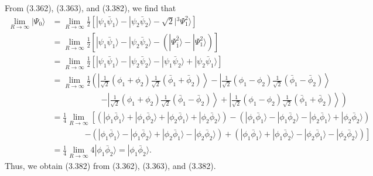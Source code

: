 \documentclass[a4paper]{book}
\newcounter{solution}[chapter]
\begin{document}
	\begin{solution}
	
	From (3.362), (3.363), and (3.382), we find that
	\begin{align*}
		\lim_{ R \rightarrow \infty } | \Psi_0 \rangle &= \lim_{ R \rightarrow \infty } \frac{1}{2} \left[ | \psi_1 \bar{\psi}_1 \rangle - | \psi_2 \bar{\psi}_2 \rangle - \sqrt{2} | {}^3 \Psi^2_1 \rangle \right] \\
		&= \lim_{ R \rightarrow \infty } \frac{1}{2} \left[ | \psi_1 \bar{\psi}_1 \rangle - | \psi_2 \bar{\psi}_2 \rangle - \left( | \Psi^{\bar{2}}_{\bar{1}} \rangle - | \Psi^2_1 \rangle  \right) \right] \\
		&= \lim_{ R \rightarrow \infty } \frac{1}{2} \left[ | \psi_1 \bar{\psi}_1 \rangle - | \psi_2 \bar{\psi}_2 \rangle - | \psi_1 \bar{\psi}_2 \rangle + | \psi_2 \bar{\psi}_1 \rangle \right] \\
		&= \lim_{ R \rightarrow \infty } \frac{1}{2} \left( \left| \frac{1}{ \sqrt{2} }( \phi_1 + \phi_2 ) \frac{1}{ \sqrt{2} }( \bar{\phi}_1 + \bar{\phi}_2 ) \right\rangle - \left|  \frac{1}{ \sqrt{2} }( \phi_1 - \phi_2 ) \frac{1}{ \sqrt{2} }( \bar{\phi}_1 - \bar{\phi}_2 ) \right\rangle \right. \\
		&\hspace{6em} \left. - \left| \frac{1}{ \sqrt{2} }( \phi_1 + \phi_2 ) \frac{1}{ \sqrt{2} }( \bar{\phi}_1 - \bar{\phi}_2 ) \right\rangle + \left|  \frac{1}{ \sqrt{2} }( \phi_1 - \phi_2 ) \frac{1}{ \sqrt{2} }( \bar{\phi}_1 + \bar{\phi}_2 ) \right\rangle \right) \\
		&= \frac{1}{4} \lim_{ R \rightarrow \infty } \left[ \left( | \phi_1 \bar{\phi}_1 \rangle + | \phi_1 \bar{\phi}_2 \rangle + | \phi_2 \bar{\phi}_1 \rangle + | \phi_2 \bar{\phi}_2 \rangle \right) - \left( | \phi_1 \bar{\phi}_1 \rangle - | \phi_1 \bar{\phi}_2 \rangle - | \phi_2 \bar{\phi}_1 \rangle + | \phi_2 \bar{\phi}_2 \rangle \right) \right. \\
		&\hspace{4em} \left. - \left( | \phi_1 \bar{\phi}_1 \rangle - | \phi_1 \bar{\phi}_2 \rangle + | \phi_2 \bar{\phi}_1 \rangle - | \phi_2 \bar{\phi}_2 \rangle \right) + \left( | \phi_1 \bar{\phi}_1 \rangle + | \phi_1 \bar{\phi}_2 \rangle - | \phi_2 \bar{\phi}_1 \rangle - | \phi_2 \bar{\phi}_2 \rangle \right) \right] \\
		&= \frac{1}{4} \lim_{ R \rightarrow \infty } 4 | \phi_1 \bar{\phi}_2 \rangle = | \phi_1 \bar{\phi}_2 \rangle .
	\end{align*}
	Thus, we obtain (3.382) from (3.362), (3.363), and (3.382).
	
	\end{solution}
	
\end{document}
